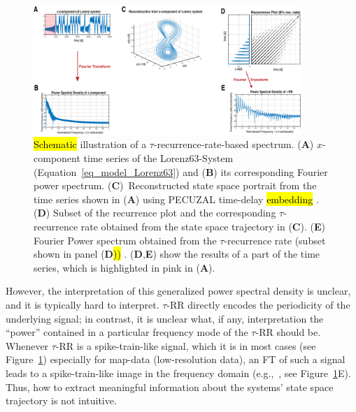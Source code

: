 \documentclass[entropy,article,accept,pdftex,moreauthors]{Definitions/mdpi}
\begin{document}
\begin{figure}[H]
 \includegraphics[width=0.9\textwidth]{./figures/fig_tau_rr_spectrum_example}
 \caption{\hl{Schematic} %
 illustration of a $\tau$-recurrence-rate-based spectrum. (\textbf{A}) $x$-component time series of the Lorenz63-System (Equation~\eqref{eq_model_Lorenz63}) and 
 (\textbf{B}) its corresponding Fourier power spectrum. 
 (\textbf{C})~Reconstructed state space portrait from the time series shown in (\textbf{A}) using PECUZAL time-delay \hl{embedding} %
 \cite{Kraemer2021}. 
 (\textbf{D}) Subset of the recurrence plot and the corresponding $\tau$-recurrence rate obtained from the state space trajectory in (\textbf{C}). 
(\textbf{E}) Fourier Power spectrum obtained from the $\tau$-recurrence rate (subset shown in panel (\textbf{D}\hl{))} %
 \cite{Zbilut2008}. (\textbf{D},\textbf{E}) show the results of a part of the time series, 
 which is highlighted in pink in (\textbf{A}).
 }\label{fig_tau_rr_spectrum_example}
\end{figure}

However, the interpretation of this generalized power spectral density is unclear, and it is typically hard to interpret. $\tau$-RR directly encodes the periodicity of the underlying signal; in contrast, it is unclear what, if any, interpretation the ``power'' contained in a particular frequency mode of the $\tau$-RR should be. Whenever $\tau$-RR is a spike-train-like signal, which it is in most cases (see Figure~\ref{fig_tau_rr_spectrum_example}) especially for 
map-data (low-resolution data), an FT of such a signal leads to a spike-train-like image in the frequency domain (e.g.,~\cite{Schild1982,Cordoba1989}, see 
Figure~\ref{fig_tau_rr_spectrum_example}E). Thus, how to extract meaningful information about the systems' state space trajectory is not intuitive. 
\end{document}

